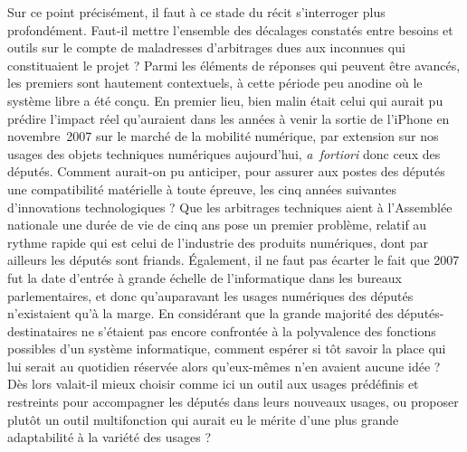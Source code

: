 \documentclass{FramateX}
\begin{document}
\begin{refsection}
Sur ce point précisément, il faut à ce stade du récit s'interroger plus
profondément. Faut-il mettre l'ensemble des décalages constatés entre
besoins et outils sur le compte de maladresses d'arbitrages dues aux
inconnues qui constituaient le projet ? Parmi les éléments de réponses
qui peuvent être avancés, les premiers sont hautement contextuels, à
cette période peu anodine où le système libre a été conçu. En premier
lieu, bien malin était celui qui aurait pu prédire l'impact réel
qu'auraient dans les années à venir la sortie de l'iPhone en
novembre~2007 sur le marché de la mobilité numérique, par extension sur
nos usages des objets techniques numériques aujourd'hui,
\textit{a~fortiori} donc ceux des députés. Comment aurait-on pu
anticiper, pour assurer aux postes des députés une compatibilité
matérielle à toute épreuve, les cinq années suivantes d'innovations
technologiques ? Que les arbitrages techniques aient à l'Assemblée
nationale une durée de vie de cinq ans pose un premier problème,
relatif au rythme rapide qui est celui de l'industrie des produits
numériques, dont par ailleurs les députés sont friands. Également, il
ne faut pas écarter le fait que 2007 fut la date d'entrée à grande
échelle de l'informatique dans les bureaux parlementaires, et donc
qu'auparavant les usages numériques des députés n'existaient qu'à la
marge. En considérant que la grande majorité des députés-destinataires
ne s'étaient pas encore confrontée à la polyvalence des fonctions
possibles d'un système informatique, comment espérer si tôt savoir la
place qui lui serait au quotidien réservée alors qu'eux-mêmes n'en
avaient aucune idée ? Dès lors valait-il mieux choisir comme ici un
outil aux usages prédéfinis et restreints pour accompagner les députés
dans leurs nouveaux usages, ou proposer plutôt un outil multifonction
qui aurait eu le mérite d'une plus grande adaptabilité à la variété des
usages ?


\end{refsection}
\end{document}
